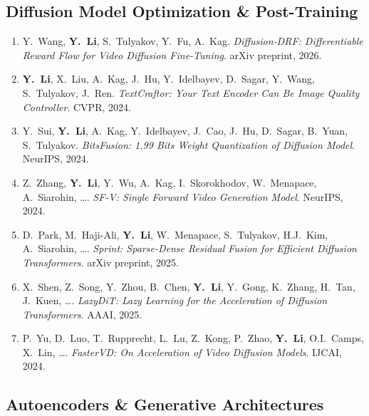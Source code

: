 \documentclass[11pt,letterpaper]{article}
\newcommand{\pub}[4]{%
    \item #1. \textit{#2}. #3, #4.
}
\begin{document}
\subsection*{Diffusion Model Optimization \& Post-Training}

\begin{enumerate}[resume]

\pub{Y.\ Wang, \textbf{Y.\ Li}, S.\ Tulyakov, Y.\ Fu, A.\ Kag}
    {Diffusion-DRF: Differentiable Reward Flow for Video Diffusion Fine-Tuning}
    {arXiv preprint}{2026}

\pub{\textbf{Y.\ Li}, X.\ Liu, A.\ Kag, J.\ Hu, Y.\ Idelbayev, D.\ Sagar, Y.\ Wang, S.\ Tulyakov, J.\ Ren}
    {TextCraftor: Your Text Encoder Can Be Image Quality Controller}
    {CVPR}{2024}

\pub{Y.\ Sui, \textbf{Y.\ Li}, A.\ Kag, Y.\ Idelbayev, J.\ Cao, J.\ Hu, D.\ Sagar, B.\ Yuan, S.\ Tulyakov}
    {BitsFusion: 1.99 Bits Weight Quantization of Diffusion Model}
    {NeurIPS}{2024}

\pub{Z.\ Zhang, \textbf{Y.\ Li}, Y.\ Wu, A.\ Kag, I.\ Skorokhodov, W.\ Menapace, A.\ Siarohin, \ldots}
    {SF-V: Single Forward Video Generation Model}
    {NeurIPS}{2024}

\pub{D.\ Park, M.\ Haji-Ali, \textbf{Y.\ Li}, W.\ Menapace, S.\ Tulyakov, H.J.\ Kim, A.\ Siarohin, \ldots}
    {Sprint: Sparse-Dense Residual Fusion for Efficient Diffusion Transformers}
    {arXiv preprint}{2025}

\pub{X.\ Shen, Z.\ Song, Y.\ Zhou, B.\ Chen, \textbf{Y.\ Li}, Y.\ Gong, K.\ Zhang, H.\ Tan, J.\ Kuen, \ldots}
    {LazyDiT: Lazy Learning for the Acceleration of Diffusion Transformers}
    {AAAI}{2025}

\pub{P.\ Yu, D.\ Luo, T.\ Rupprecht, L.\ Lu, Z.\ Kong, P.\ Zhao, \textbf{Y.\ Li}, O.I.\ Camps, X.\ Lin, \ldots}
    {FasterVD: On Acceleration of Video Diffusion Models}
    {IJCAI}{2024}

\end{enumerate}

\subsection*{Autoencoders \& Generative Architectures}
\end{document}
